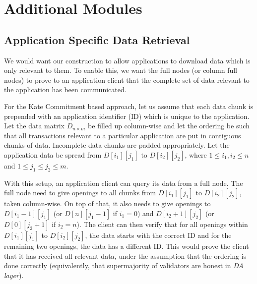 \documentclass[sigconf, screen=true, nonacm]{acmart}
\newcommand{\DA}{\textit{DA layer}}
\begin{document}
\section{Additional Modules}
    \subsection{Application Specific Data Retrieval}
        We would want our construction to allow applications to download data which is only relevant to them. To enable this, we want the full nodes (or column full nodes) to prove to an application client that the complete set of data relevant to the application has been communicated.

        

        For the Kate Commitment based approach, let us assume that each data chunk is prepended with an application identifier (ID) which is unique to the application. 
        Let the data matrix $D_{n \times m}$ be filled up column-wise and let the ordering be such that all transactions relevant to a particular application are put in contiguous chunks of data. Incomplete data chunks are padded appropriately. Let the application data be spread from $D[i_1][j_1]$ to $D[i_2][j_2]$, where $1 \leq i_1, i_2 \leq n$ and $1 \leq j_1 \leq j_2 \leq m$.   

        With this setup, an application client can query its data from a full node. The full node need to give openings to all chunks from $D[i_1][j_1]$ to $D[i_2][j_2]$, taken column-wise. On top of that, it also needs to give openings to $D[i_1-1][j_1]$ (or $D[n][j_1-1]$ if $i_1=0$) and $D[i_2+1][j_2]$ (or $D[0][j_2+1]$ if $i_2=n$). The client can then verify that for all openings within $D[i_1][j_1]$ to $D[i_2][j_2]$, the data starts with the correct ID and for the remaining two openings, the data has a different ID. This would prove the client that it has received all relevant data, under the assumption that the ordering is done correctly (equivalently, that supermajority of validators are honest in \DA). 
\end{document}

